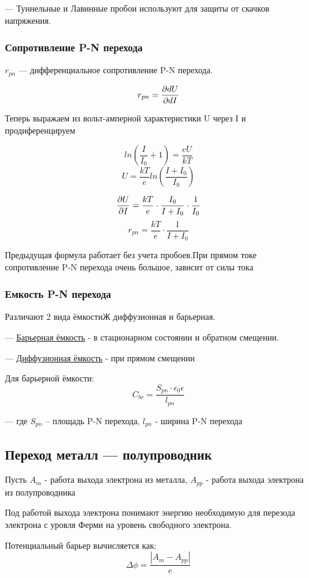 \documentclass[../main.tex]{subfiles}
\begin{document}
--- Туннельные и Лавинные пробои используют для защиты от скачков напряжения.

\subsubsection{Сопротивление P-N перехода}

$r_{pn}$ --- дифференциальное сопротивление P-N перехода.

\[r_{pn} = \frac{\partial dU}{\partial dI}\]

Теперь выражаем из вольт-амперной характеристики U через I и продиференцируем

\[ ln(\frac{I}{I_0} + 1) = \frac{eU}{kT}\]
\[U = \frac{kT}{e} ln(\frac{I+I_0}{I_0})\]

\[\frac{\partial U}{\partial I} = \frac{kT}{e} \cdot \frac{I_0}{I+I_0} \cdot \frac{1}{I_0}\]
\[r_{pn} = \frac{kT}{e} \cdot \frac{1}{I+I_0} \]

Предыдущая формула работает без учета пробоев.При прямом токе сопротивление P-N перехода очень большое, зависит от силы тока

\subsubsection{Емкость P-N перехода}

Различают 2 вида ёмкостиЖ диффузионная и барьерная.

--- \underline{Барьерная ёмкость} - в стационарном состоянии и обратном смещении.

--- \underline{Диффузионная ёмкость} - при прямом смещении

Для барьерной ёмкости:
\[C_{br} = \frac{S_{pn} \cdot \epsilon_0\epsilon}{l_{pn}}\]
\begin{center}
    --- где $S_{pn}$ -- площадь P-N перехода, $l_{pn}$ - ширина P-N перехода
\end{center}

\subsection{Переход металл --- полупроводник}
Пусть $A_m$ - работа выхода электрона из металла, $A_{pp}$ - работа выхода электрона из полупроводника

Под работой выхода электрона понимают энергию необходимую для перезода электрона с уровля Ферми на уровень свободного электрона.

Потенциальный барьер вычисляется как:
\[\Delta \phi = \frac{|A_m - A_{pp}|}{e}\]
\end{document}
